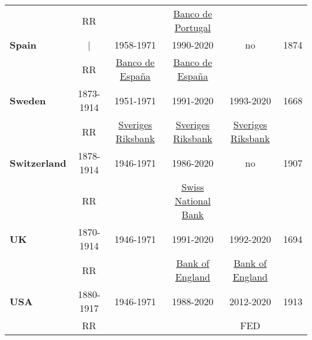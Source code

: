 \begin{landscape}
\begin{table}[]
\begin{longtable}{l*{1}{cccc|c}}
         & RR \citeyear{Reinhart2009}  &  \cite{Bordo1995B}  & \href{https://www.bportugal.pt/}{Banco de Portugal} &  \\
[1ex]
\textbf{Spain}  & |  & 1958-1971 & 1990-2020 & no & 1874\\
         & RR \citeyear{Reinhart2009}  & \href{https://www.bde.es/bde/en/}{Banco de España} & \href{https://www.bde.es/bde/en/}{Banco de España} &  & \\
[1ex]
\textbf{Sweden}    & 1873-1914  & 1951-1971  & 1991-2020 & 1993-2020 & 1668\\
    & RR \citeyear{Reinhart2009}  & \href{https://www.riksbank.se/en-gb/about-the-riksbank/history/}{Sveriges Riksbank} & \href{https://www.riksbank.se/en-gb/about-the-riksbank/history/}{Sveriges Riksbank} & \href{https://www.riksbank.se/en-gb/about-the-riksbank/history/}{Sveriges Riksbank} \\
[1ex]
\textbf{Switzerland}  & 1878-1914  & 1946-1971 & 1986-2020 & no & 1907 \\
         & RR \citeyear{Reinhart2009}  & \cite{Baltensperger2017} &  \href{https://www.snb.ch/en/iabout/snb/hist/id/hist_wpc}{Swiss National Bank} &  & \\
[1ex]
\textbf{UK}       & 1870-1914 & 1946-1971  & 1991-2020 & 1992-2020 & 1694\\
    & RR \citeyear{Reinhart2009} & \cite{Bordo1999}  & \href{https://www.bankofengland.co.uk/about/history}{Bank of England} & \href{https://www.bankofengland.co.uk/about/history}{Bank of England} \\
[1ex]
\textbf{USA}     & 1880-1917 & 1946-1971  & 1988-2020  & 2012-2020  & 1913\\
    & RR \citeyear{Reinhart2009}  & \cite{Bordo1999} & \cite{Goodfriend2004} & FED \\
\hline\hline
\end{longtable}
\vspace{-3ex}
\end{table}
\end{landscape}